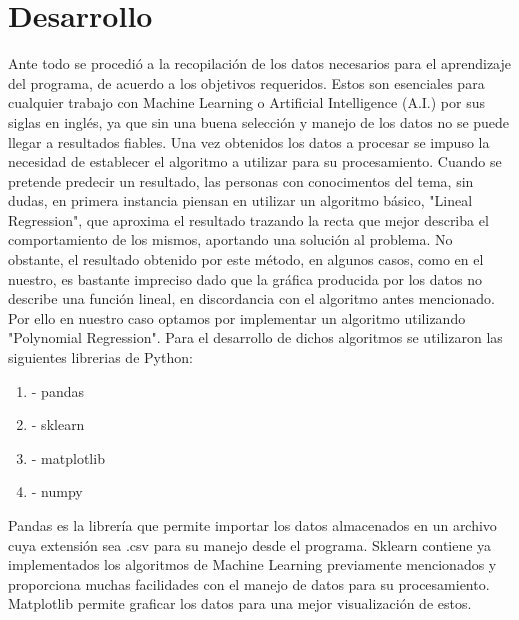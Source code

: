 \documentclass[a4paper,12pt]{article}
\begin{document}
\section{Desarrollo}
\cline{-} Ante todo se procedi\'{o} a la recopilaci\'{o}n de los datos necesarios para el aprendizaje del programa, de acuerdo a los objetivos requeridos. Estos son esenciales para cualquier trabajo con Machine Learning o Artificial Intelligence (A.I.) por sus siglas en ingl\'{e}s, ya que sin una buena selecci\'{o}n y manejo de los datos no se puede llegar a resultados fiables.
\cline{-} Una vez obtenidos los datos a procesar se impuso la necesidad de establecer el algoritmo a utilizar para su procesamiento.
\cline{-} Cuando se pretende predecir un resultado, las personas con conocimentos del tema, sin dudas, en primera instancia piensan en utilizar un algoritmo b\'{a}sico, "Lineal Regression", que aproxima el resultado trazando la recta que mejor describa el comportamiento de los mismos, aportando una soluci\'{o}n al problema. No obstante, el resultado obtenido por este m\'{e}todo, en algunos casos, como en el nuestro, es bastante impreciso dado que la gr\'{a}fica producida por los datos no describe una funci\'{o}n lineal, en discordancia con el algoritmo antes mencionado. Por ello en nuestro caso optamos por implementar un algoritmo utilizando "Polynomial Regression". 
\cline{-} Para el desarrollo de dichos algoritmos se utilizaron las siguientes librerias de Python:
\begin{enumerate}
\item - pandas
\item - sklearn
\item - matplotlib
\item - numpy
\end{enumerate}
\cline{-} Pandas es la librer\'{i}a que permite importar los datos almacenados en un archivo cuya extensi\'{o}n sea .csv para su manejo desde el programa.
\cline{-} Sklearn contiene ya implementados los algoritmos de Machine Learning previamente mencionados y proporciona muchas facilidades con el manejo de datos para su procesamiento.
\cline{-} Matplotlib permite graficar los datos para una mejor visualizaci\'{o}n de estos.
\end{document}

